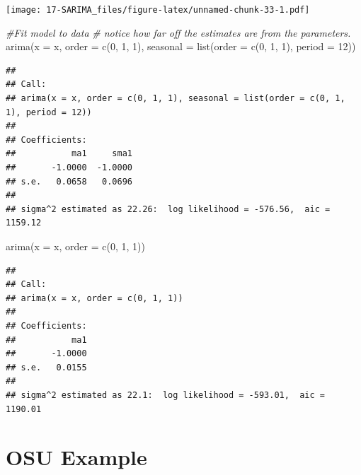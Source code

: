 \documentclass[
]{book}
\newenvironment{Shaded}{\begin{snugshade}}{\end{snugshade}}
\newcommand{\AttributeTok}[1]{\textcolor[rgb]{0.77,0.63,0.00}{#1}}
\newcommand{\CommentTok}[1]{\textcolor[rgb]{0.56,0.35,0.01}{\textit{#1}}}
\newcommand{\DecValTok}[1]{\textcolor[rgb]{0.00,0.00,0.81}{#1}}
\newcommand{\FunctionTok}[1]{\textcolor[rgb]{0.00,0.00,0.00}{#1}}
\newcommand{\NormalTok}[1]{#1}
\theoremstyle{definition}
\theoremstyle{definition}
\theoremstyle{definition}
\theoremstyle{definition}
\theoremstyle{remark}
\begin{document}
\texttt{[image: 17-SARIMA\_files/figure-latex/unnamed-chunk-33-1.pdf]}

\begin{Shaded}
\begin{Highlighting}[]
\CommentTok{\#Fit model to data }
\CommentTok{\# notice how far off the estimates are from the parameters.  }
  \FunctionTok{arima}\NormalTok{(}\AttributeTok{x =}\NormalTok{ x, }\AttributeTok{order =} \FunctionTok{c}\NormalTok{(}\DecValTok{0}\NormalTok{, }\DecValTok{1}\NormalTok{, }\DecValTok{1}\NormalTok{), }\AttributeTok{seasonal =} \FunctionTok{list}\NormalTok{(}\AttributeTok{order =} \FunctionTok{c}\NormalTok{(}\DecValTok{0}\NormalTok{, }\DecValTok{1}\NormalTok{, }\DecValTok{1}\NormalTok{), }\AttributeTok{period =} \DecValTok{12}\NormalTok{))}
\end{Highlighting}
\end{Shaded}

\begin{verbatim}
## 
## Call:
## arima(x = x, order = c(0, 1, 1), seasonal = list(order = c(0, 1, 1), period = 12))
## 
## Coefficients:
##           ma1     sma1
##       -1.0000  -1.0000
## s.e.   0.0658   0.0696
## 
## sigma^2 estimated as 22.26:  log likelihood = -576.56,  aic = 1159.12
\end{verbatim}

\begin{Shaded}
\begin{Highlighting}[]
\FunctionTok{arima}\NormalTok{(}\AttributeTok{x =}\NormalTok{ x, }\AttributeTok{order =} \FunctionTok{c}\NormalTok{(}\DecValTok{0}\NormalTok{, }\DecValTok{1}\NormalTok{, }\DecValTok{1}\NormalTok{))}
\end{Highlighting}
\end{Shaded}

\begin{verbatim}
## 
## Call:
## arima(x = x, order = c(0, 1, 1))
## 
## Coefficients:
##           ma1
##       -1.0000
## s.e.   0.0155
## 
## sigma^2 estimated as 22.1:  log likelihood = -593.01,  aic = 1190.01
\end{verbatim}

\hypertarget{osu-example}{%
\section{OSU Example}\label{osu-example}}
\end{document}
